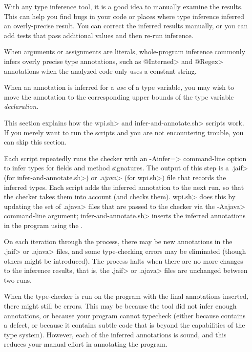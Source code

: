 With any type inference tool, it is a good idea to manually examine the
results.  This can help you find bugs in your code or places where type
inference inferred an overly-precise result.
You can correct the inferred results manually, or you can
add tests that pass additional values and then re-run inference.

When arguments or assignments are literals, whole-program inference
commonly infers overly precise type annotations, such as \<@Interned> and
\<@Regex> annotations when the analyzed code only uses a constant string.

When an annotation is inferred for a \emph{use} of a type variable,
you may wish to move the annotation
to the corresponding upper bounds of the type variable \emph{declaration}.



This section explains how the \<wpi.sh> and \<infer-and-annotate.sh> scripts work.  If you
merely want to run the scripts and you are not encountering trouble, you can
skip this section.

Each script repeatedly runs the checker with an \<-Ainfer=> command-line option to infer
types for fields and method signatures.  The output of this step
is a \<.jaif> (for \<infer-and-annotate.sh>) or \<.ajava> (for \<wpi.sh>) file that records the inferred types.
Each script adds the inferred annotation to the next run, so that the checker takes them into
account (and checks them). \<wpi.sh> does this by updating the set of \<.ajava> files that are passed
to the checker via the \<-Aajava> command-line argument;
\<infer-and-annotate.sh> inserts the inferred annotations in the program using the
.

On each
iteration through the process, there may be new annotations in the \<.jaif> or \<.ajava>
files, and some type-checking errors may be eliminated (though others might
be introduced).
The process halts when there are no more changes to the inference results,
that is, the \<.jaif> or \<.ajava> files are unchanged between two runs.

When the type-checker is run on the program with the final annotations
inserted, there might still be errors.  This may be because the tool did
not infer enough annotations, or because your program cannot typecheck
(either because contains a defect, or because it contains subtle code that
is beyond the capabilities of the type system).
However, each of the inferred annotations is sound, and this reduces your
manual effort in annotating the program.

